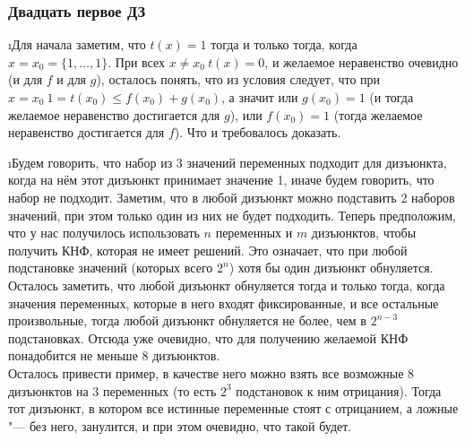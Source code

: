 \subsubsection{Двадцать первое ДЗ}

\i Для начала заметим, что $t(x) = 1$ тогда и только тогда, когда $x = x_0 = \{1, \ldots, 1\}$. При всех $x \ne x_0\ t(x) = 0$, и желаемое неравенство очевидно (и для $f$ и для $g$), осталось понять, что из условия следует, что при $x=x_0\ 1 = t(x_0) \leq f(x_0) + g(x_0)$, а значит или $g(x_0) = 1$ (и тогда желаемое неравенство достигается для $g$), или $f(x_0) = 1$ (тогда желаемое неравенство достигается для $f$). Что и требовалось доказать.

\i Будем говорить, что набор из 3 значений переменных подходит для дизъюнкта, когда на нём этот дизъюнкт принимает значение 1, иначе будем говорить, что набор не подходит. Заметим, что в любой дизъюнкт можно подставить 2 наборов значений, при этом только один из них не будет подходить. Теперь предположим, что у нас получилось использовать $n$ переменных и $m$ дизъюнктов, чтобы получить КНФ, которая не имеет решений. Это означает, что при любой подстановке значений (которых всего $2^n$) хотя бы один дизъюнкт обнуляется. Осталось заметить, что любой дизъюнкт обнуляется тогда и только тогда, когда значения переменных, которые в него входят фиксированные, и все остальные произвольные, тогда любой дизъюнкт обнуляется не более, чем в $2^{n-3}$ подстановках. Отсюда уже очевидно, что для получению желаемой КНФ понадобится не меньше 8 дизъюнктов.\\
Осталось привести пример, в качестве него можно взять все возможные 8 дизъюнктов на 3 переменных (то есть $2^3$ подстановок к ним отрицания). Тогда тот дизъюнкт, в котором все истинные переменные стоят с отрицанием, а ложные "--- без него, занулится, и при этом очевидно, что такой будет.

